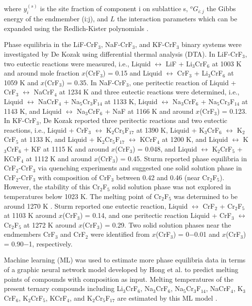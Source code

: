 where $y_i^{(s)}$ is the site fraction of component i on sublattice s, ${^o}G_{i:j}$ the Gibbs energy of the endmember (i:j), and $L$ the interaction parameters which can be expanded using the Redlich-Kister polynomials \cite{redlich1948algebraic}. 

Phase equilibria in the LiF-CrF${_3}$, NaF-CrF${_3}$, and KF-CrF${_3}$ binary systems were investigated by De Kozak \cite{de1975systeme, DeKozak1969} using differential thermal analysis (DTA). In LiF-CrF${_3}$, two eutectic reactions were measured, i.e., Liquid $\leftrightarrow$ LiF + Li$_3$CrF$_6$ at 1003 K and around mole fraction $x$(CrF${_3}$) = 0.15 and Liquid $\leftrightarrow$ CrF${_3}$ + Li$_3$CrF$_6$ at 1059 K and $x$(CrF${_3}$) = 0.35. In NaF-CrF${_3}$, one peritectic reaction of Liquid + CrF${_3}$ $\leftrightarrow$ NaCrF$_4$ at 1234 K and three eutectic reactions were determined, i.e., Liquid $\leftrightarrow$ NaCrF$_4$ + Na$_5$Cr$_3$F$_{14}$ at 1133 K, Liquid $\leftrightarrow$ Na$_3$CrF$_6$ + Na$_5$Cr$_3$F$_{14}$ at 1143 K, and Liquid $\leftrightarrow$ Na$_3$CrF$_6$ + NaF at 1166 K and around $x$(CrF${_3}$) = 0.123. In KF-CrF${_3}$, De Kozak \cite{de1975systeme, DeKozak1969} reported three peritectic reactions and two eutectic reactions, i.e., Liquid + CrF${_3}$ $\leftrightarrow$ K$_2$Cr$_5$F$_{17}$ at 1390 K, Liquid + K$_3$CrF$_6$ $\leftrightarrow$ K$_2$CrF$_5$ at 1133 K, and Liquid + K$_2$Cr$_5$F$_{17}$ $\leftrightarrow$ KCrF$_4$ at 1200 K, and Liquid $\leftrightarrow$ K$_3$CrF$_6$ + KF at 1115 K and around $x$(CrF${_3}$) = 0.048, and Liquid $\leftrightarrow$ K$_2$CrF$_5$ + KCrF$_4$ at 1112 K and around $x$(CrF${_3}$) = 0.45. Sturm \cite{sturm1962phase} reported phase equilibria in CrF${_2}$-CrF${_3}$ via quenching experiments and suggested one solid solution phase in CrF${_2}$-CrF${_3}$ with composition of CrF${_3}$ between 0.42 and 0.46 (near Cr$_2$F$_5$). However, the stability of this Cr$_2$F$_5$ solid solution phase was not explored in temperatures below 1023 K. The melting point of Cr$_2$F$_5$ was determined to be around 1270 K \cite{sturm1962phase}. Sturm \cite{sturm1962phase} reported one eutectic reaction, Liquid $\leftrightarrow$ CrF${_2}$ + Cr$_2$F$_5$ at 1103 K around $x$(CrF${_3}$) = 0.14, and one peritectic reaction Liquid + CrF${_3}$ $\leftrightarrow$ Cr$_2$F$_5$ at 1272 K around $x$(CrF${_3}$) = 0.29. Two solid solution phases near the endmembers CrF${_3}$ and CrF${_2}$ were identified from $x$(CrF${_3}$) = 0$-$0.01 and $x$(CrF${_3}$) = 0.90$-$1, respectively. 

Machine learning (ML) was used to estimate more phase equilibria data in terms of a graphic neural network model developed by Hong et al. \cite{hong2022melting} to predict melting points of compounds with composition as input. Melting temperatures of the present ternary compounds including Li$_3$CrF$_6$, Na$_3$CrF$_6$, Na$_5$Cr$_3$F$_{14}$, NaCrF$_4$, K$_3$CrF$_6$, K$_2$CrF$_5$, KCrF$_4$, and K$_2$Cr$_5$F$_{17}$ are estimated by this ML model \cite{hong2022melting}. 

